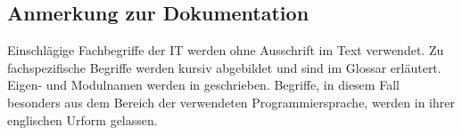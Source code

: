 \subsection{Anmerkung zur Dokumentation}
\label{sec:Anmerkung zur Dokumentation}
Einschlägige Fachbegriffe der IT werden ohne Ausschrift im Text verwendet. Zu fachspezifische
Begriffe werden kursiv abgebildet und sind im Glossar erläutert. Eigen- und Modulnamen werden in
\anf{ } geschrieben. Begriffe, in diesem Fall besonders aus dem Bereich der verwendeten Programmiersprache,
werden in ihrer englischen Urform gelassen.
\pagebreak
